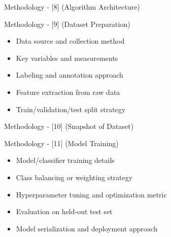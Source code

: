 \begin{frame}{Methodology - [8] (Algorithm Architecture)}
    \begin{center}
        \vspace{1em}
    \end{center}
\end{frame}

\begin{frame}{Methodology - [9] (Dataset Preparation)}
    \begin{itemize}
        \item Data source and collection method
        \item Key variables and measurements
        \item Labeling and annotation approach
        \item Feature extraction from raw data
        \item Train/validation/test split strategy
    \end{itemize}
\end{frame}

\begin{frame}{Methodology - [10] (Snapshot of Dataset)}
    \begin{center}
        \vspace{1em}
    \end{center}
\end{frame}

\begin{frame}{Methodology - [11] (Model Training)}
    \begin{itemize}
        \item Model/classifier training details
        \item Class balancing or weighting strategy
        \item Hyperparameter tuning and optimization metric
        \item Evaluation on held-out test set
        \item Model serialization and deployment approach
    \end{itemize}
\end{frame}
